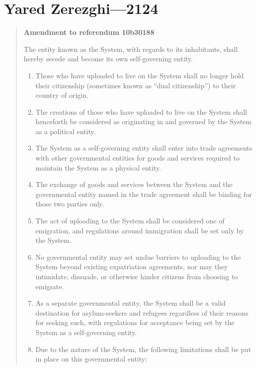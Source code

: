 \hypertarget{yared-zerezghi-2124}{%
\chapter{Yared Zerezghi---2124}\label{yared-zerezghi-2124}}

\begin{quote}
\textbf{Amendment to referendum 10b30188}

The entity known as the System, with regards to its inhabitants, shall hereby secede and become its own self-governing entity.

\begin{enumerate}
\def\labelenumi{\arabic{enumi}.}
\tightlist
\item
  Those who have uploaded to live on the System shall no longer hold their citizenship (sometimes known as ``dual citizenship'') to their country of origin.
\item
  The creations of those who have uploaded to live on the System shall henceforth be considered as originating in and governed by the System as a political entity.
\item
  The System as a self-governing entity shall enter into trade agreements with other governmental entities for goods and services required to maintain the System as a physical entity.
\item
  The exchange of goods and services between the System and the governmental entity named in the trade agreement shall be binding for those two parties only.
\item
  The act of uploading to the System shall be considered one of emigration, and regulations around immigration shall be set only by the System.
\item
  No governmental entity may set undue barriers to uploading to the System beyond existing expatriation agreements, nor may they intimidate, dissuade, or otherwise hinder citizens from choosing to emigrate.
\item
  As a separate governmental entity, the System shall be a valid destination for asylum-seekers and refugees regardless of their reasons for seeking such, with regulations for acceptance being set by the System as a self-governing entity.
\item
  Due to the nature of the System, the following limitations shall be put in place on this governmental entity:


\end{enumerate}
\end{quote}
